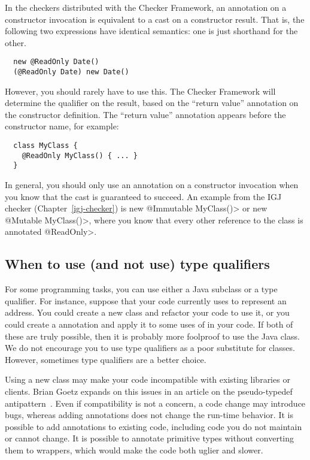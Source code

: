 
In the checkers distributed with the Checker Framework, an annotation on a
constructor invocation is equivalent to a cast on a constructor result.
That is, the following two expressions have identical semantics:  one is
just shorthand for the other.

\begin{Verbatim}
  new @ReadOnly Date()
  (@ReadOnly Date) new Date()
\end{Verbatim}

However, you should rarely have to use this.  The Checker Framework will
determine the qualifier on the result, based on the ``return value''
annotation on the constructor definition.  The ``return value'' annotation
appears before the constructor name, for example:

\begin{Verbatim}
  class MyClass {
    @ReadOnly MyClass() { ... }
  }
\end{Verbatim}

In general, you should only use an annotation on a constructor invocation
when you know that the cast is
guaranteed to succeed.  An example from the IGJ checker
(Chapter~\ref{igj-checker}) is \<new @Immutable MyClass()> or \<new
@Mutable MyClass()>, where you know that every other reference to the class
is annotated \<@ReadOnly>.


\subsection{When to use (and not use) type qualifiers\label{when-to-use-type-qualifiers}}

For some programming tasks, you can use either a Java subclass or a type
qualifier.  For instance, suppose that your code currently uses
 to represent an address.  You could create a new 
class and refactor your code to use it, or you could create a
 annotation and apply it to some uses of  in
your code.  If both of these are truly possible, then it is probably more
foolproof to use the Java class.  We do not encourage you to use type
qualifiers as a poor substitute for classes.  However, sometimes type
qualifiers are a better choice.

Using a new class may make your code incompatible with existing libraries or
clients.  Brian Goetz expands on this issues in an article on the
pseudo-typedef antipattern~\cite{Goetz2006:typedef}.  Even if compatibility
is not a concern, a code change may introduce bugs, whereas adding
annotations does not change the run-time behavior.  It is possible to add
annotations to existing code, including code you do not maintain or cannot
change.  It is possible to annotate primitive types without converting them
to wrappers, which would make the code both uglier and slower.

